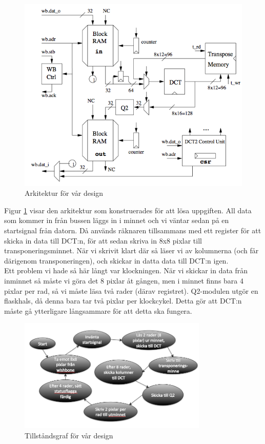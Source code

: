 \documentclass[a4paper]{article}
\begin{document}
\begin{figure}[h]
\centering
\includegraphics[scale=0.5]{architecture.png}
\caption{Arkitektur för vår design}
\label{fig:architecture}
\end{figure}

Figur \ref{fig:architecture} visar den arkitektur som konstruerades för
att lösa uppgiften. All data som kommer in från bussen läggs in i minnet
och vi väntar sedan på en startsignal från datorn. Då används räknaren
tillsammans med ett register för att skicka in data till DCT:n, för att
sedan skriva in 8x8 pixlar till transponeringsminnet. När vi skrivit
klart där så läser vi av kolumnerna (och får därigenom transponeringen),
och skickar in datta data till DCT:n igen.\\

Ett problem vi hade så här långt var klockningen. När vi skickar in data
från inminnet så måste vi göra det 8 pixlar åt gången, men i minnet
finns bara 4 pixlar per rad, så vi måste läsa två rader (därav
registret). Q2-modulen utgör en flaskhals, då denna bara tar två pixlar
per klockcykel. Detta gör att DCT:n måste gå ytterligare långsammare för
att detta ska fungera.\\

\begin{figure}[h]
\centering
\includegraphics[width=340px]{states.png}
\caption{Tillståndsgraf för vår design}
\label{fig:state}
\end{figure}
\end{document}
